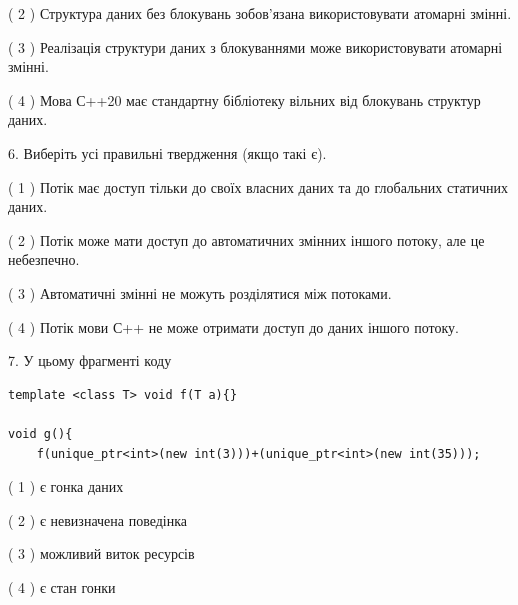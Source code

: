 \documentclass[12pt, ukrainian]{article}
\begin{document}
\begin {large}
{( 2 ) Структура даних без блокувань зобов’язана використовувати атомарні змінні.%

( 3 ) Реалізація структури даних з блокуваннями може використовувати атомарні змінні.%

( 4 ) Мова С++20 має стандартну бібліотеку вільних від блокувань структур даних.%
\newpage



\vspace{5mm}
6. Виберіть усі правильні твердження (якщо такі є).\par
\vspace{2mm}

( 1 ) Потік має доступ тільки до своїх власних даних та до глобальних статичних даних.%

( 2 ) Потік може мати доступ до автоматичних змінних іншого потоку, але це небезпечно.%

( 3 ) Автоматичні змінні не можуть розділятися між потоками.%

( 4 ) Потік мови С++ не може отримати доступ до даних іншого потоку.%


\vspace{5mm}
7. У цьому фрагменті коду
\begin{verbatim}
template <class T> void f(T a){}

void g(){
    f(unique_ptr<int>(new int(3)))+(unique_ptr<int>(new int(35)));
\end{verbatim}

( 1 ) є гонка даних%

( 2 ) є невизначена поведінка%

( 3 ) можливий виток ресурсів%

( 4 ) є стан гонки%
}
\end {large}
\end{document}
